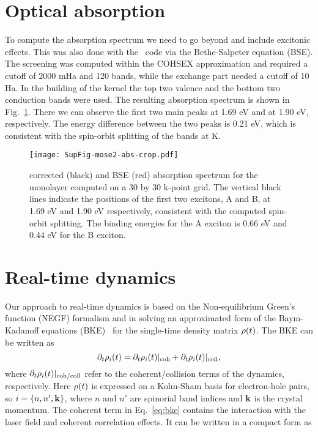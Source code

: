\documentclass[prb,aps,superscriptaddress,reprint,floatfix]{revtex4-1}
\begin{document}
\section{Optical absorption}
\label{bse}
To compute the absorption spectrum we need to go beyond \gw and include excitonic effects. This was also done with the \Yambo~code via the Bethe-Salpeter equation (BSE). The screening was computed within the COHSEX approximation and required a cutoff of 2000 mHa and 120 bands, while the exchange part needed a cutoff of 10 Ha. In the building of the kernel the top two valence and the bottom two conduction bands were used.
The resulting absorption spectrum is shown in Fig.~\ref{fig:bse}. There we can observe the first two main peaks at 1.69 eV and at 1.90 eV, respectively. The energy difference between the two peaks is 0.21 eV, which is consistent with the spin-orbit splitting of the bands at K. 

\begin{figure}[ht]
	\texttt{[image: SupFig-mose2-abs-crop.pdf]}
\caption{\gw corrected (black) and BSE (red) absorption spectrum for the \mose monolayer computed on a 30 by 30 k-point grid. The vertical black lines indicate the positions of the first two excitons, A and B, at 1.69 eV and 1.90 eV respectively, consistent with the computed spin-orbit splitting. The binding energies for the A exciton is 0.66 eV and 0.44 eV for the B exciton.}
\label{fig:bse}
\end{figure}

\section{Real-time dynamics}
\label{rt}
Our approach to real-time dynamics is based on the Non-equilibrium Green's function (NEGF) formalism and in solving an approximated form of the Baym-Kadanoff equations (BKE)~\cite{pedro-paper,m.2012,PhysRevB.84.245110,PhysRevB.92.205304} for the single-time density matrix $\rho(t)$. The BKE can be written as~\cite{pedro-paper,m.2012,PhysRevB.84.245110,PhysRevB.92.205304}
\begin{equation}
\partial_t \rho_i(t) = \partial_t\rho_i(t)|_\text{coh} + \partial_t\rho_i(t)|_\text{coll},
\label{eq:bke}
\end{equation}
where $\partial_t\rho_i(t)|_\text{coh/coll}$ refer to the coherent/collision terms of the dynamics, respectively. Here $\rho(t)$ is expressed on a Kohn-Sham basis for electron-hole pairs, so $i = \{n,n',{\mathbf k}\}$, where $n$ and $n'$ are spinorial band indices and ${\mathbf k}$ is the crystal momentum.
The coherent term in Eq.~\eqref{eq:bke} contains the interaction with the laser field and coherent correlation effects. It can be written in a compact form as
\end{document}

